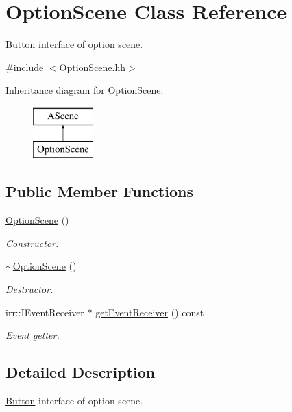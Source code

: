 \hypertarget{classOptionScene}{}\section{Option\+Scene Class Reference}
\label{classOptionScene}


\hyperlink{classButton}{Button} interface of option scene.  




{\ttfamily \#include $<$Option\+Scene.\+hh$>$}

Inheritance diagram for Option\+Scene\+:\begin{figure}[H]
\begin{center}
\leavevmode
\includegraphics[height=2.000000cm]{classOptionScene}
\end{center}
\end{figure}
\subsection*{Public Member Functions}
\begin{DoxyCompactItemize}
\item 
\hyperlink{classOptionScene_ac0dfacf1988c5dcfe2520970735fab10}{Option\+Scene} ()
\begin{DoxyCompactList}\small\item\em Constructor. \end{DoxyCompactList}\item 
\hyperlink{classOptionScene_ab8de71400c4ed7f2a47cedfedb13f327}{$\sim$\+Option\+Scene} ()
\begin{DoxyCompactList}\small\item\em Destructor. \end{DoxyCompactList}\item 
irr\+::\+I\+Event\+Receiver $\ast$ \hyperlink{classOptionScene_a8848b9040ee7fd9c1d05a22181c5e053}{get\+Event\+Receiver} () const
\begin{DoxyCompactList}\small\item\em Event getter. \end{DoxyCompactList}\end{DoxyCompactItemize}


\subsection{Detailed Description}
\hyperlink{classButton}{Button} interface of option scene. 

